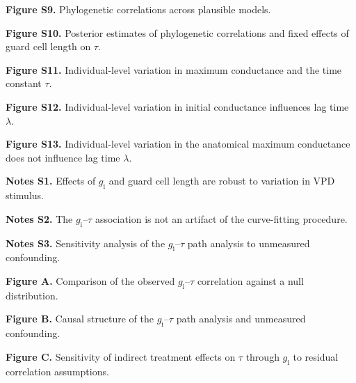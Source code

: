 \documentclass[
  letterpaper,
  DIV=11,
  numbers=noendperiod]{scrartcl}
\begin{document}
\begin{flushleft}
\textbf{Figure S9.} Phylogenetic correlations across plausible models.

\textbf{Figure S10.} Posterior estimates of phylogenetic correlations
and fixed effects of guard cell length on \(\tau\).

\textbf{Figure S11.} Individual-level variation in maximum conductance
and the time constant \(\tau\).

\textbf{Figure S12.} Individual-level variation in initial conductance
influences lag time \(\lambda\).

\textbf{Figure S13.} Individual-level variation in the anatomical
maximum conductance does not influence lag time \(\lambda\).

\textbf{Notes S1.} Effects of \(g_\mathrm{i}\) and guard cell length are
robust to variation in VPD stimulus.

\textbf{Notes S2.} The \(g_\mathrm{i}\)--\(\tau\) association is not an
artifact of the curve-fitting procedure.

\textbf{Notes S3.} Sensitivity analysis of the
\(g_\mathrm{i}\)--\(\tau\) path analysis to unmeasured confounding.

\textbf{Figure A.} Comparison of the observed \(g_\mathrm{i}\)--\(\tau\)
correlation against a null distribution.

\textbf{Figure B.} Causal structure of the \(g_\mathrm{i}\)--\(\tau\)
path analysis and unmeasured confounding.

\textbf{Figure C.} Sensitivity of indirect treatment effects on \(\tau\)
through \(g_\mathrm{i}\) to residual correlation assumptions.

\end{flushleft}
\end{document}
